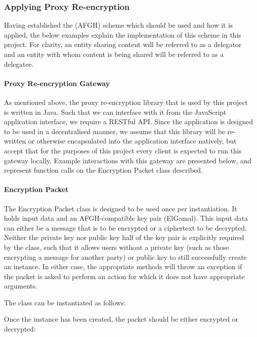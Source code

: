 \subsubsection{Applying Proxy Re-encryption}

Having established the (AFGH) scheme which should be used and how it is applied, the below examples explain the implementation of this scheme in this project. For clarity, an entity sharing content will be referred to as a delegator and an entity with whom content is being shared will be referred to as a delegatee.

\paragraph{Proxy Re-encryption Gateway}

As mentioned above, the proxy re-encryption library that is used by this project is written in Java. Such that we can interface with it from the JavaScript application interface, we require a RESTful API. Since the application is designed to be used in a decentralised manner, we assume that this library will be re-written or otherwise encapsulated into the application interface natively, but accept that for the purposes of this project every client is expected to run this gateway locally. Example interactions with this gateway are presented below, and represent function calls on the Encryption Packet class described.

\paragraph{Encryption Packet}

The Encryption Packet class is designed to be used once per instantiation. It holds input data and an AFGH-compatible key pair (ElGamal). This input data can either be a message that is to be encrypted or a ciphertext to be decrypted. Neither the private key nor public key half of the key pair is explicitly required by the class, such that it allows users without a private key (such as those encrypting a message for another party) or public key to still successfully create an instance. In either case, the appropriate methods will throw an exception if the packet is asked to perform an action for which it does not have appropriate arguments.

The class can be instantiated as follows:



Once the instance has been created, the packet should be either encrypted or decrypted:

